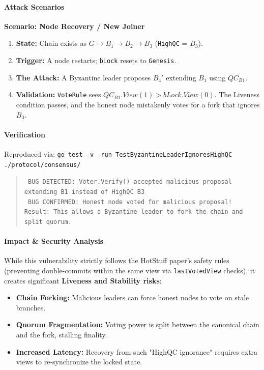 \documentclass{article}
\theoremstyle{plain}
\theoremstyle{definition}
\theoremstyle{remark}
\begin{document}
{\paragraph{Attack Scenarios}
\textbf{Scenario: Node Recovery / New Joiner}
\begin{enumerate}
    \item \textbf{State:} Chain exists as $G \rightarrow B_1 \rightarrow B_2 \rightarrow B_3$ (\texttt{HighQC} = $B_3$).
    \item \textbf{Trigger:} A node restarts; \texttt{bLock} resets to \texttt{Genesis}.
    \item \textbf{The Attack:} A Byzantine leader proposes $B_4'$ extending $B_1$ using $QC_{B1}$.
    \item \textbf{Validation:} \texttt{VoteRule} sees $QC_{B1}.View(1) > bLock.View(0)$. The Liveness condition passes, and the honest node mistakenly votes for a fork that ignores $B_3$.
\end{enumerate}

\paragraph{Verification}
Reproduced via: \texttt{go test -v -run TestByzantineLeaderIgnoresHighQC ./protocol/consensus/}
\begin{quote}
\texttt{ BUG DETECTED: Voter.Verify() accepted malicious proposal extending B1 instead of HighQC B3} \\
\texttt{ BUG CONFIRMED: Honest node voted for malicious proposal!} \\
\texttt{Result: This allows a Byzantine leader to fork the chain and split quorum.}
\end{quote}

\paragraph{Impact \& Security Analysis}
While this vulnerability strictly follows the HotStuff paper's safety rules (preventing double-commits within the same view via \texttt{lastVotedView} checks), it creates significant \textbf{Liveness and Stability risks}:
\begin{itemize}
    \item \textbf{Chain Forking:} Malicious leaders can force honest nodes to vote on stale branches.
    \item \textbf{Quorum Fragmentation:} Voting power is split between the canonical chain and the fork, stalling finality.
    \item \textbf{Increased Latency:} Recovery from such "HighQC ignorance" requires extra views to re-synchronize the locked state.
\end{itemize}
}
\end{document}
